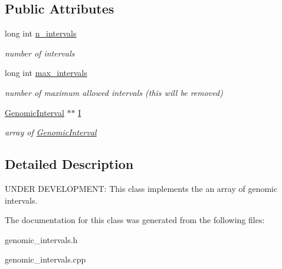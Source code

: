 \subsection*{Public Attributes}
\begin{CompactItemize}
\item 
\hypertarget{classGenomicIntervalSetAsArray_9f9558bbaa8d682993a60fa142893998}{
long int \hyperlink{classGenomicIntervalSetAsArray_9f9558bbaa8d682993a60fa142893998}{n\_\-intervals}}
\label{classGenomicIntervalSetAsArray_9f9558bbaa8d682993a60fa142893998}

\begin{CompactList}\small\item\em number of intervals \item\end{CompactList}\item 
\hypertarget{classGenomicIntervalSetAsArray_6580b875cd9804ba59f88c5000f83f09}{
long int \hyperlink{classGenomicIntervalSetAsArray_6580b875cd9804ba59f88c5000f83f09}{max\_\-intervals}}
\label{classGenomicIntervalSetAsArray_6580b875cd9804ba59f88c5000f83f09}

\begin{CompactList}\small\item\em number of maximum allowed intervals (this will be removed) \item\end{CompactList}\item 
\hypertarget{classGenomicIntervalSetAsArray_f7ec8bbfea7748695aa35e6ec467a4b2}{
\hyperlink{classGenomicInterval}{GenomicInterval} $\ast$$\ast$ \hyperlink{classGenomicIntervalSetAsArray_f7ec8bbfea7748695aa35e6ec467a4b2}{I}}
\label{classGenomicIntervalSetAsArray_f7ec8bbfea7748695aa35e6ec467a4b2}

\begin{CompactList}\small\item\em array of \hyperlink{classGenomicInterval}{GenomicInterval} \item\end{CompactList}\end{CompactItemize}


\subsection{Detailed Description}
UNDER DEVELOPMENT: This class implements the an array of genomic intervals. 

The documentation for this class was generated from the following files:\begin{CompactItemize}
\item 
genomic\_\-intervals.h\item 
genomic\_\-intervals.cpp\end{CompactItemize}
